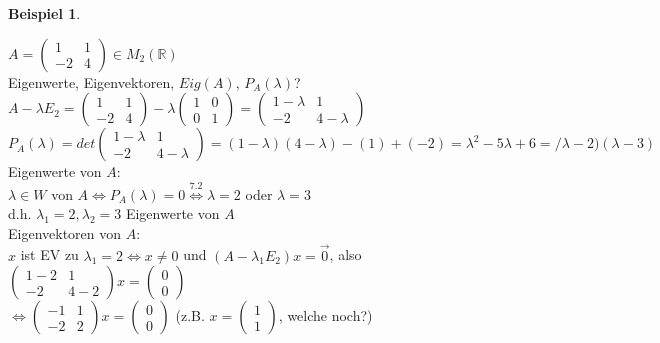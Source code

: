 \documentclass[a4paper,11pt]{article}
\newtheorem{bsp}[definition]{Beispiel}
\begin{document}
\begin{bsp}
\end{bsp}
$A=\begin{pmatrix}1&1\\-2&4\end{pmatrix}\in M_2(\mathbb{R})$ \\
Eigenwerte, Eigenvektoren, $Eig(A)$, $P_A(\lambda)$? \\
$A-\lambda E_2=\begin{pmatrix}1&1\\-2&4\end{pmatrix}-\lambda\begin{pmatrix}1&0\\0&1\end{pmatrix}=\begin{pmatrix}1-\lambda&1\\-2&4-\lambda\end{pmatrix}$ \\
$P_A(\lambda)=det\begin{pmatrix}1-\lambda&1\\-2&4-\lambda\end{pmatrix}=(1-\lambda)(4-\lambda)-(1)+(-2)=\lambda^2-5\lambda+6=/\lambda-2)(\lambda-3)$ \\
Eigenwerte von $A$: \\
$\lambda\in W$ von $A\Leftrightarrow P_A(\lambda)=0\overset{7.2}{\Leftrightarrow}\lambda=2$ oder $\lambda=3$ \\
d.h. $\lambda_1=2,\lambda_2=3$ Eigenwerte von $A$ \\
Eigenvektoren von $A$: \\
$x$ ist EV zu $\lambda_1=2\Leftrightarrow x\neq0$ und $(A-\lambda_1E_2)x=\overset{\rightarrow}{0}$, also $\begin{pmatrix}1-2&1\\-2&4-2\end{pmatrix}x=\begin{pmatrix}0\\0\end{pmatrix}$ \\
$\Leftrightarrow\begin{pmatrix}-1&1\\-2&2\end{pmatrix}x=\begin{pmatrix}0\\0\end{pmatrix}$ (z.B. $x=\begin{pmatrix}1\\1\end{pmatrix}$, welche noch?)
\end{document}

